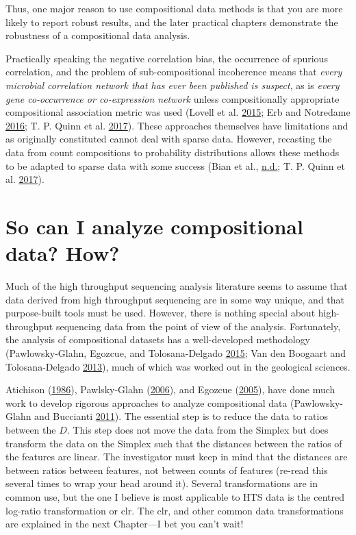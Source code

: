\documentclass[onecolumn]{book}
\theoremstyle{definition}
\theoremstyle{definition}
\theoremstyle{definition}
\theoremstyle{remark}
\begin{document}
Thus, one major reason to use compositional data methods is that you are
more likely to report robust results, and the later practical chapters
demonstrate the robustness of a compositional data analysis.

Practically speaking the negative correlation bias, the occurrence of
spurious correlation, and the problem of sub-compositional incoherence
means that
\emph{every microbial correlation network that has ever been published is suspect},
as is \emph{every gene co-occurrence or co-expression network} unless
compositionally appropriate compositional association metric was used
(Lovell et al. \protect\hyperlink{ref-Lovell:2015}{2015}; Erb and
Notredame \protect\hyperlink{ref-erb:2016}{2016}; T. P. Quinn et al.
\protect\hyperlink{ref-Quinn206425}{2017}). These approaches themselves
have limitations and as originally constituted cannot deal with sparse
data. However, recasting the data from count compositions to probability
distributions allows these methods to be adapted to sparse data with
some success (Bian et al., \protect\hyperlink{ref-bian:2017}{n.d.}; T.
P. Quinn et al. \protect\hyperlink{ref-Quinn206425}{2017}).

\hypertarget{so-can-i-analyze-compositional-data-how}{%
\section{So can I analyze compositional data?
How?}\label{so-can-i-analyze-compositional-data-how}}

Much of the high throughput sequencing analysis literature seems to
assume that data derived from high throughput sequencing are in some way
unique, and that purpose-built tools must be used. However, there is
nothing special about high-throughput sequencing data from the point of
view of the analysis. Fortunately, the analysis of compositional
datasets has a well-developed methodology (Pawlowsky-Glahn, Egozcue, and
Tolosana-Delgado \protect\hyperlink{ref-pawlowsky2015modeling}{2015};
Van den Boogaart and Tolosana-Delgado
\protect\hyperlink{ref-van2013}{2013}), much of which was worked out in
the geological sciences.

Atichison (\protect\hyperlink{ref-Aitchison:1986}{1986}), Pawlsky-Glahn
(\protect\hyperlink{ref-Pawlowsky-Glahn:2006}{2006}), and Egozcue
(\protect\hyperlink{ref-egozcue2005}{2005}), have done much work to
develop rigorous approaches to analyze compositional data
(Pawlowsky-Glahn and Buccianti
\protect\hyperlink{ref-pawlowsky2011compositional}{2011}). The essential
step is to reduce the data to ratios between the \(D\). This step does
not move the data from the Simplex but does transform the data on the
Simplex such that the distances between the ratios of the features are
linear. The investigator must keep in mind that the distances are
between ratios between features, not between counts of features (re-read
this several times to wrap your head around it). Several transformations
are in common use, but the one I believe is most applicable to HTS data
is the centred log-ratio transformation or clr. The clr, and other
common data transformations are explained in the next Chapter---I bet
you can't wait!
\end{document}
